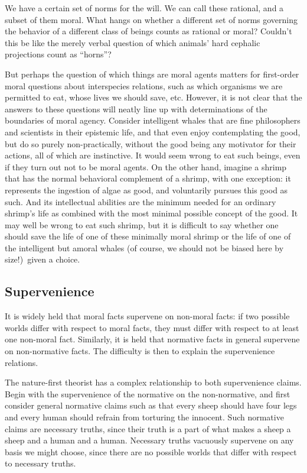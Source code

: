 We have a certain set of norms for the will. We can call these rational, and a subset of them moral. What hangs on whether a different
set of norms governing the behavior of a different class of beings counts as rational or moral? Couldn't this be like the merely verbal question of
which animals' hard cephalic projections count as ``horns''? 

But perhaps the question of which things are moral agents matters for first-order moral questions about interspecies relations, such 
as which organisms we are permitted to eat, whose lives we should save, etc. However, it is not clear that the answers to these questions will neatly line up with
determinations of the boundaries of moral agency. Consider intelligent whales that are fine philosophers and scientists in their epistemic life, 
and that even enjoy contemplating the good, but do so purely non-practically, without the good being any motivator for their 
actions, all of which are instinctive. It would seem wrong to eat such beings, even if they turn out not to be moral agents.
On the other hand, imagine a shrimp that has the normal behavioral complement of a shrimp, with one exception: it represents
the ingestion of algae as good, and voluntarily pursues this good as such. And its intellectual abilities are the minimum needed
for an ordinary shrimp's life as combined with the most minimal possible concept of the good. It may well be wrong to eat such shrimp,
but it is difficult to say whether one should save the life of one of these minimally moral shrimp or the life of one of the intelligent but amoral 
whales (of course, we should not be biased here by size!)\ given a choice.

\subsection{Supervenience}
It is widely held that moral facts supervene on non-moral facts: if two possible worlds differ
with respect to moral facts, they must differ with respect to at least one non-moral fact. Similarly,
it is held that normative facts in general supervene on non-normative facts. The difficulty is then
to explain the supervenience relations.

The nature-first theorist has a complex relationship to both supervenience claims. Begin
with the supervenience of the normative on the non-normative, and first consider
general normative claims such as that every sheep should have four legs and every human should refrain
from torturing the innocent. Such normative claims are necessary truths, since their truth is a part of
what makes a sheep a sheep and a human and a human. Necessary truths vacuously supervene on any basis
we might choose, since there are no possible worlds that differ with respect to necessary truths.

